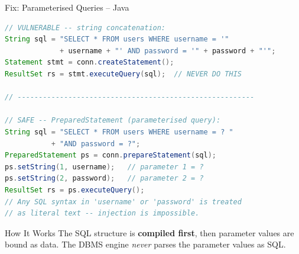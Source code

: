 \begin{frame}[fragile]{Fix: Parameterised Queries -- Java}
  \begin{lstlisting}[style=sqlstyle, language=Java]
// VULNERABLE -- string concatenation:
String sql = "SELECT * FROM users WHERE username = '"
             + username + "' AND password = '" + password + "'";
Statement stmt = conn.createStatement();
ResultSet rs = stmt.executeQuery(sql);  // NEVER DO THIS

// --------------------------------------------------------

// SAFE -- PreparedStatement (parameterised query):
String sql = "SELECT * FROM users WHERE username = ? "
           + "AND password = ?";
PreparedStatement ps = conn.prepareStatement(sql);
ps.setString(1, username);   // parameter 1 = ?
ps.setString(2, password);   // parameter 2 = ?
ResultSet rs = ps.executeQuery();
// Any SQL syntax in 'username' or 'password' is treated
// as literal text -- injection is impossible.
  \end{lstlisting}

  \begin{block}{How It Works}
    The SQL structure is \textbf{compiled first}, then parameter values are bound as data.
    The DBMS engine \emph{never} parses the parameter values as SQL.
  \end{block}
\end{frame}


